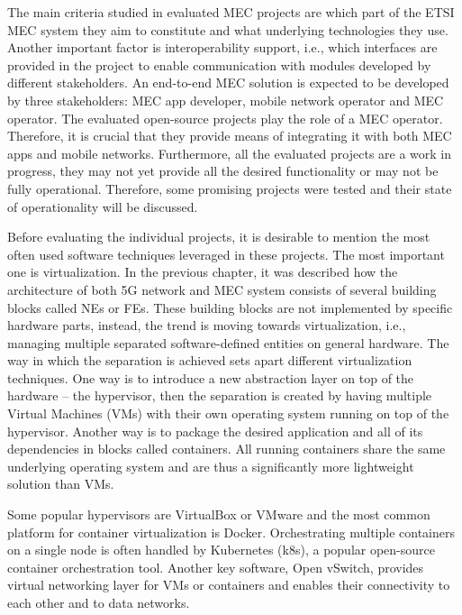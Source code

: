 \documentclass[12pt,a4paper,twoside]{report}
\begin{document}
The main criteria studied in evaluated MEC projects are which part of the ETSI MEC system they aim to constitute and what underlying technologies they use. Another important factor is interoperability support, i.e., which interfaces are provided in the project to enable communication with modules developed by different stakeholders. An end-to-end MEC solution is expected to be developed by three stakeholders: MEC app developer, mobile network operator and MEC operator. The evaluated open-source projects play the role of a MEC operator. Therefore, it is crucial that they provide means of integrating it with both MEC apps and mobile networks. Furthermore, all the evaluated projects are a work in progress, they may not yet provide all the desired functionality or may not be fully operational. Therefore, some promising projects were tested and their state of operationality will be discussed. 

Before evaluating the individual projects, it is desirable to mention the most often used software techniques leveraged in these projects. The most important one is virtualization. In the previous chapter, it was described how the architecture of both 5G network and MEC system consists of several building blocks called NEs or FEs. These building blocks are not implemented by specific hardware parts, instead, the trend is moving towards virtualization, i.e., managing multiple separated software-defined entities on general hardware. The way in which the separation is achieved sets apart different virtualization techniques. One way is to introduce a new abstraction layer on top of the hardware – the hypervisor, then the separation is created by having multiple Virtual Machines (VMs) with their own operating system running on top of the hypervisor. Another way is to package the desired application and all of its dependencies in blocks called containers. All running containers share the same underlying operating system and are thus a significantly more lightweight solution than VMs. 

Some popular hypervisors are VirtualBox or VMware and the most common platform for container virtualization is Docker. Orchestrating multiple containers on a single node is often handled by Kubernetes (k8s), a popular open-source container orchestration tool. Another key software, Open vSwitch, provides virtual networking layer for VMs or containers and enables their connectivity to each other and to data networks.
\end{document}
